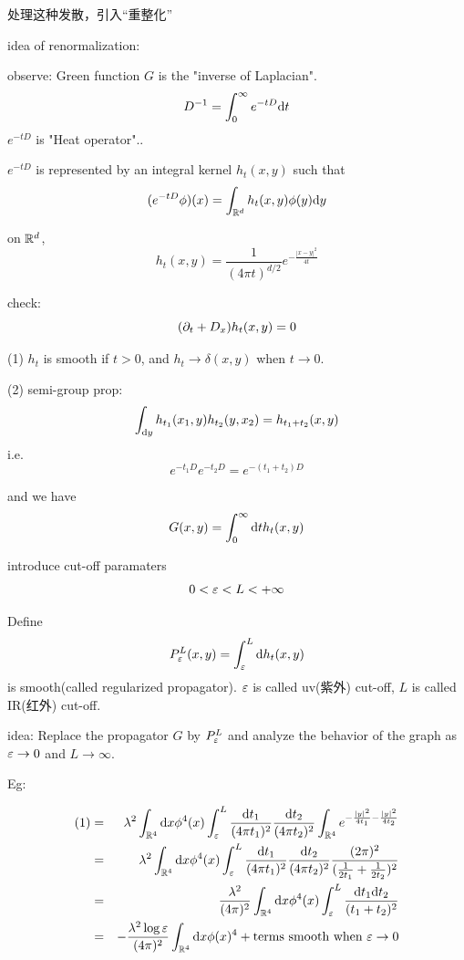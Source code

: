 处理这种发散，引入“重整化”

idea of renormalization:

observe: Green function $G$ is the "inverse of Laplacian".
$$D^{-1}=\int_0^\infty e^{-tD}\mathrm{d} t$$
$e^{-tD}$ is "Heat operator"..

$e^{-tD}$ is represented by an integral kernel 
$h_t(x,y)$ such that 
$$(e^{-tD}\phi)(x)=\int_{\mathbb{R}^d}h_t(x,y)\phi(y)\mathrm{d} y$$

on $\mathbb{R}^d$, 
$$h_t(x,y)=\frac{1}{(4\pi t)^{d/2}}e^{-\frac{|x-y|^2}{4t}}$$

check:
$$(\partial_t+D_x)h_t(x,y)=0$$

\begin{prop}

(1) $h_t$ is smooth if $t>0$, and $h_t\to\delta(x,y)$ when $t\to 0$.

(2) semi-group prop:
$$\int_{\mathrm{d} y}h_{t_1}(x_1,y)h_{t_2}(y,x_2)=h_{t_1+t_2}(x,y)$$
i.e.
$$e^{-t_1 D}e^{-t_2D}=e^{-(t_1+t_2)D}$$
\end{prop}

and we have
$$G(x,y)=\int_0^\infty \mathrm{d} t h_t(x,y)$$

introduce cut-off paramaters
$$0<\varepsilon<L<+\infty$$

Define 
$$P^L_{\varepsilon}(x,y)=\int_\varepsilon^L\mathrm{d} h_t(x,y)$$
is smooth(called regularized propagator).
$\varepsilon$ is called uv(紫外) cut-off,
$L$ is  called IR(红外) cut-off.

idea: Replace the propagator $G$ by $P^L_\varepsilon$ 
and analyze the behavior of the graph as $\varepsilon\to 0$ and $L\to\infty$.

Eg:


\begin{eqnarray*}
     (1)
&=&
     \lambda^2\int_{\mathbb{R}^4}
       \mathrm{d} x\phi^4(x)
         \int_\varepsilon^L
           \frac{\mathrm{d} t_1}{(4\pi t_1)^2}
           \frac{\mathrm{d} t_2}{(4\pi t_2)^2}
             \int_{\mathbb{R}^4}
               e^{-\frac{|y|^2}{4t_1}-\frac{|y|^2}{4t_2}}\\
&=&
     \lambda^2\int_{\mathbb{R}^4}
       \mathrm{d} x\phi^4(x)
         \int_\varepsilon^L
           \frac{\mathrm{d} t_1}{(4\pi t_1)^2}
           \frac{\mathrm{d} t_2}{(4\pi t_2)^2}
           \frac{(2\pi)^2}{(\frac{1}{2t_1}+\frac{1}{2t_2})^2}\\
&=&
     \frac{\lambda^2}{(4\pi)^2}
     \int_{\mathbb{R}^4}
       \mathrm{d} x\phi^4(x)
       \int_\varepsilon^L
         \frac{\mathrm{d} t_1\mathrm{d} t_2}{(t_1+t_2)^2}\\
&=&
     -\frac{\lambda^2\log\varepsilon}{(4\pi)^2}
     \int_{\mathbb{R}^4}\mathrm{d} x \phi(x)^4
     +\text{terms smooth when $\varepsilon\to 0$}
\end{eqnarray*}

